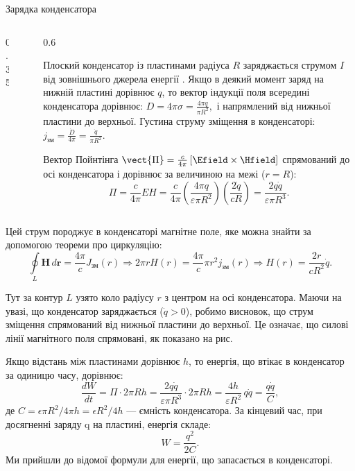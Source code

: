 \documentclass[onlytextwidth]{beamer}
\begin{document}
\begin{frame}{Зарядка конденсатора}{}
\begin{columns}
\begin{column}{0.35\linewidth}
		\end{column}
		\
		\begin{column}{0.6\linewidth}
			\begin{overprint}
				\begin{block}{}\justifying
					Плоский конденсатор із пластинами радіуса \( R \) заряджається струмом \( I \) від зовнішнього джерела енергії . Якщо в
					деякий момент
					заряд на нижній пластині дорівнює \( q \), то вектор індукції поля всередині конденсатора дорівнює:
					\(
					D = 4 \pi \sigma = \frac{4 \pi q}{\pi R^2},
					\)
					і напрямлений від нижньої пластини до верхньої.
					Густина струму зміщення в конденсаторі:
					\(
					j_{\text{зм}} = \frac{\dot{D}}{4 \pi} = \frac{\dot{q}}{\pi R^2}.
					\)
				\end{block}
				\onslide<2>
				\begin{block}{}\justifying
					Вектор Пойнтінга
					\(
					\vect{\Pi} = \frac{c}{4\pi}\left[\Efield\times\Hfield\right]
					\)
					спрямований до осі конденсатора і дорівнює за величиною на межі (\( r = R \)):
					\[
						\Pi = \frac{c}{4 \pi} EH = \frac{c}{4 \pi} \left( \frac{4 \pi q}{\varepsilon \pi R^2} \right) \left( \frac{2
							\dot{q}}{c R}
						\right) =
						\frac{2 q \dot{q}}{\varepsilon
							\pi R^3}.
					\]
				\end{block}
			\end{overprint}
		\end{column}
	\end{columns}
	\begin{overprint}
		\begin{block}{}\justifying
			Цей струм породжує в конденсаторі магнітне поле, яке можна знайти за допомогою теореми про циркуляцію:
			\[
				\oint\limits_{L} \mathbf{H} \, d\mathbf{r} = \frac{4 \pi}{c} J_{\text{зм}}(r)
				\Rightarrow 2 \pi r H(r) = \frac{4 \pi}{c} \pi r^2 j_{\text{зм}}(r)
				\Rightarrow H(r) = \frac{2r}{c R^2} \dot{q}.
			\]

			Тут за контур \( L \) узято коло радіусу \( r \) з центром на осі конденсатора. Маючи на увазі, що конденсатор заряджається (\(
			\dot{q} > 0 \)), робимо висновок, що струм зміщення спрямований від нижньої пластини до верхньої. Це означає, що силові лінії
			магнітного поля
			спрямовані, як 	показано на рис.
		\end{block}
		\begin{block}{}\justifying
			Якщо відстань між пластинами дорівнює \( h \), то енергія, що втікає в конденсатор за одиницю часу, дорівнює:
			\[
				\frac{dW}{dt} = \Pi \cdot 2 \pi R h = \frac{2 q \dot{q}}{\varepsilon \pi R^3} \cdot 2 \pi R h = \frac{4h}{\varepsilon R^2}\, q \dot{q} = \frac{q \dot{q}}{C},
			\]
			де \( C = \epsilon \pi R^2 / 4\pi h = \epsilon R^2/4h\) --- ємність конденсатора. За кінцевий час, при досягненні заряду q на пластині, енергія складе:
			\[
				W = \frac{q^2}{2C}.
			\]
			Ми прийшли до відомої формули для енергії, що запасається в конденсаторі.
		\end{block}
	\end{overprint}
\end{frame}
\end{document}
